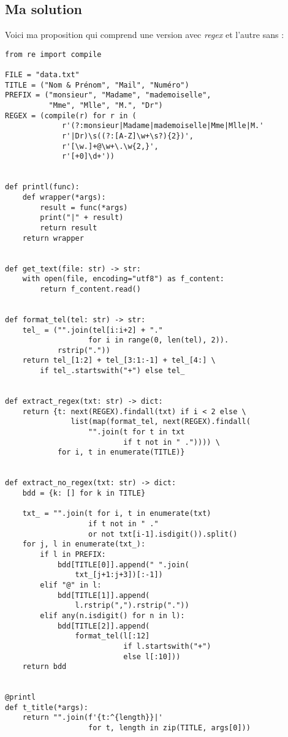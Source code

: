 \subsection*{Ma solution}
Voici ma proposition qui comprend une version avec \textit{regex} et l'autre sans :
\begin{lstlisting}
from re import compile

FILE = "data.txt"
TITLE = ("Nom & Prénom", "Mail", "Numéro")
PREFIX = ("monsieur", "Madame", "mademoiselle",
          "Mme", "Mlle", "M.", "Dr")
REGEX = (compile(r) for r in (
             r'(?:monsieur|Madame|mademoiselle|Mme|Mlle|M.'
             r'|Dr)\s((?:[A-Z]\w+\s?){2})',
             r'[\w.]+@\w+\.\w{2,}',
             r'[+0]\d+'))


def printl(func):
    def wrapper(*args):
        result = func(*args)
        print("|" + result)
        return result
    return wrapper


def get_text(file: str) -> str:
    with open(file, encoding="utf8") as f_content:
        return f_content.read()


def format_tel(tel: str) -> str:
    tel_ = ("".join(tel[i:i+2] + "."
                   for i in range(0, len(tel), 2)).
            rstrip("."))
    return tel_[1:2] + tel_[3:1:-1] + tel_[4:] \
        if tel_.startswith("+") else tel_


def extract_regex(txt: str) -> dict:
    return {t: next(REGEX).findall(txt) if i < 2 else \
               list(map(format_tel, next(REGEX).findall(
                   "".join(t for t in txt
                           if t not in " .")))) \
            for i, t in enumerate(TITLE)}


def extract_no_regex(txt: str) -> dict:
    bdd = {k: [] for k in TITLE}

    txt_ = "".join(t for i, t in enumerate(txt)
                   if t not in " ."
                   or not txt[i-1].isdigit()).split()
    for j, l in enumerate(txt_):
        if l in PREFIX:
            bdd[TITLE[0]].append(" ".join(
                txt_[j+1:j+3])[:-1])
        elif "@" in l:
            bdd[TITLE[1]].append(
                l.rstrip(",").rstrip("."))
        elif any(n.isdigit() for n in l):
            bdd[TITLE[2]].append(
                format_tel(l[:12]
                           if l.startswith("+")
                           else l[:10]))
    return bdd


@printl
def t_title(*args):
    return "".join(f'{t:^{length}}|'
                   for t, length in zip(TITLE, args[0]))



\end{lstlisting}
